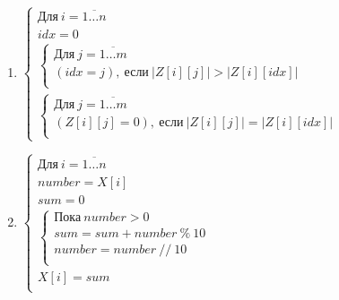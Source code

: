 \begin{enumerate}
    \item 
    \(\begin{cases}
        \text{Для}\ i = \overline{1 \dots n}\\
        idx = 0\\
        \begin{cases}
            \text{Для}\ j = \overline{1 \dots m}\\
            (idx = j),\ \text{если}\ \vert Z[i][j] \vert > \vert Z[i][idx] \vert\\     
        \end{cases}\\
        \begin{cases}
            \text{Для}\ j = \overline{1 \dots m}\\
            (Z[i][j] = 0),\ \text{если}\ \vert Z[i][j] \vert = \vert Z[i][idx] \vert\\
        \end{cases}
    \end{cases}\)
    \item 
    \(\begin{cases}
        \text{Для}\ i = \overline{1 \dots n}\\
        number = X[i]\\
        sum = 0\\
        \begin{cases}
            \text{Пока}\ number > 0\\
            sum = sum + number\ \%\ 10\\
            number = number\ //\ 10\\
        \end{cases}\\
        X[i] = sum\\
    \end{cases}\)
\end{enumerate}